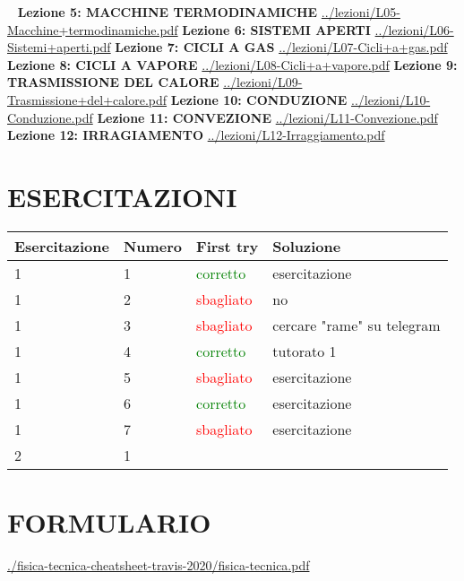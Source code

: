 \documentclass[a4paper, 9pt]{article}
\begin{document}
    \ \newline
    \newline
    \textbf{Lezione 5: MACCHINE TERMODINAMICHE}\newline
    \url{../lezioni/L05-Macchine+termodinamiche.pdf}
    \newline
    \newline
    \textbf{Lezione 6: SISTEMI APERTI}\newline
    \url{../lezioni/L06-Sistemi+aperti.pdf}
    \newline
    \newline
    \textbf{Lezione 7: CICLI A GAS}\newline
    \url{../lezioni/L07-Cicli+a+gas.pdf}
    \newline
    \newline
    \textbf{Lezione 8: CICLI A VAPORE}\newline
    \url{../lezioni/L08-Cicli+a+vapore.pdf}
    \newline
    \newline
    \textbf{Lezione 9: TRASMISSIONE DEL CALORE}\newline
    \url{../lezioni/L09-Trasmissione+del+calore.pdf}
    \newline
    \newline
    \textbf{Lezione 10: CONDUZIONE}\newline
    \url{../lezioni/L10-Conduzione.pdf}
    \newline
    \newline
    \textbf{Lezione 11: CONVEZIONE}\newline
    \url{../lezioni/L11-Convezione.pdf}
    \newline
    \newline
    \textbf{Lezione 12: IRRAGIAMENTO}\newline
    \url{../lezioni/L12-Irraggiamento.pdf}
    \newpage
    \section{ESERCITAZIONI}
    \begin{tabular}{llll}
        \textbf{Esercitazione} & \textbf{Numero} & \textbf{First try} & \textbf{Soluzione}\\
        \hline
        1 & 1 & \textcolor{green}{corretto} & esercitazione\\
        1 & 2 & \textcolor{red}{sbagliato} & no\\
        1 & 3 & \textcolor{red}{sbagliato} & cercare "rame" su telegram\\
        1 & 4 & \textcolor{green}{corretto} & tutorato 1\\
        1 & 5 & \textcolor{red}{sbagliato} & esercitazione\\
        1 & 6 & \textcolor{green}{corretto} & esercitazione\\
        1 & 7 & \textcolor{red}{sbagliato} & esercitazione\\
        \hline
        2 & 1 & & \\
    \end{tabular}
    \section{FORMULARIO}
    \url{./fisica-tecnica-cheatsheet-travis-2020/fisica-tecnica.pdf}
\end{document}
